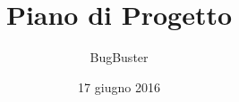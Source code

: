




\title{\textbf{Piano di Progetto}}
\author{BugBuster}

\date{17 giugno 2016}




\makeFrontPage

\tableofcontents
\listoffigures
\listoftables





